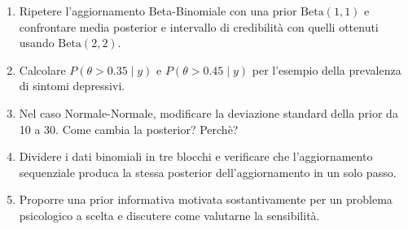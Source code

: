\documentclass[
  italian,
  letterpaper,
  a4paper,
  11pt,
  open=any]{scrbook}
\theoremstyle{plain}
\theoremstyle{definition}
\theoremstyle{definition}
\theoremstyle{remark}
\begin{document}
\begin{tcolorbox}[enhanced jigsaw, arc=.35mm, bottomrule=.15mm, bottomtitle=1mm, breakable, colback=white, colbacktitle=quarto-callout-important-color!10!white, colframe=quarto-callout-important-color-frame, coltitle=black, left=2mm, leftrule=.75mm, opacityback=0, opacitybacktitle=0.6, rightrule=.15mm, title=\textcolor{quarto-callout-important-color}{\faExclamation}\hspace{0.5em}{Esercizi}, titlerule=0mm, toprule=.15mm, toptitle=1mm]

\begin{enumerate}
\def\labelenumi{\arabic{enumi}.}
\item
  Ripetere l'aggiornamento Beta-Binomiale con una prior
  \(\text{Beta}(1,1)\) e confrontare media posterior e intervallo di
  credibilità con quelli ottenuti usando \(\text{Beta}(2,2)\).
\item
  Calcolare \(P(\theta > 0.35 \mid y)\) e \(P(\theta > 0.45 \mid y)\)
  per l'esempio della prevalenza di sintomi depressivi.
\item
  Nel caso Normale-Normale, modificare la deviazione standard della
  prior da 10 a 30. Come cambia la posterior? Perchè?
\item
  Dividere i dati binomiali in tre blocchi e verificare che
  l'aggiornamento sequenziale produca la stessa posterior
  dell'aggiornamento in un solo passo.
\item
  Proporre una prior informativa motivata sostantivamente per un
  problema psicologico a scelta e discutere come valutarne la
  sensibilità.
\end{enumerate}

\end{tcolorbox}
\end{document}
